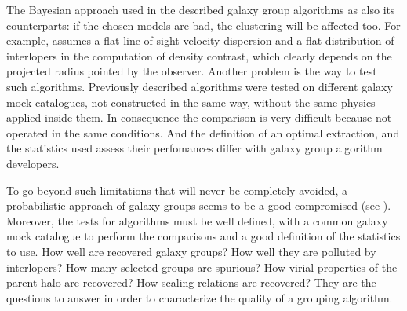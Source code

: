 The Bayesian approach used in the described galaxy group algorithms as also its
counterparts: if the chosen models are bad, the clustering will be affected
too. For example, \citet{Yang+05} assumes a flat line-of-sight velocity
dispersion and a flat distribution of interlopers in the computation of density
contrast, which clearly depends on the projected radius pointed by the
observer. Another problem is the way to test such algorithms. Previously
described algorithms were tested on different galaxy mock catalogues, not
constructed in the same way, without the same physics applied inside them. In
consequence the comparison is very difficult because not operated in the same
conditions. And the definition of an optimal extraction, and the statistics
used assess their perfomances differ with galaxy group algorithm developers.

To go beyond such limitations that will never be completely avoided,
a probabilistic approach of galaxy groups seems to be a good compromised (see
). Moreover, the tests for algorithms must be well
defined, with a common galaxy mock catalogue to perform the comparisons and a
good definition of the statistics to use. How well are recovered galaxy groups?
How well they are polluted by interlopers? How many selected groups are
spurious? How virial properties of the parent halo are recovered? How scaling
relations are recovered? They are the questions to answer in order to
characterize the quality of a grouping algorithm.

